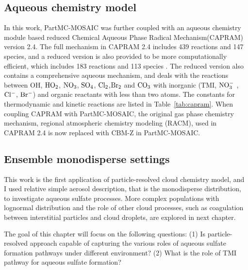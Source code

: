 \documentclass[edeposit,fullpage]{uiucthesis2009}
\begin{document}
\subsection{Aqueous chemistry model}
\label{section:aq-chem-model}
In this work, PartMC-MOSAIC was further coupled with an aqueous chemistry module based reduced Chemical Aqueous Phase Radical Mechanism(CAPRAM) version 2.4. The full mechanism in CAPRAM 2.4 includes 439 reactions and 147 species, and a reduced version is also provided to be more computationally efficient, which includes 183 reactions and 113 species \citep{Ervens2003}. The reduced version also contains a comprehensive aqueous mechanism, and deals with the reactions between OH, $\rm HO_2$, $\rm NO_3$, $\rm SO_4$, $\rm Cl_2$,$\rm Br_2$ and $\rm CO_3$ with inorganic (TMI, $\rm NO_3^-$ , $\rm Cl^-$, $\rm Br^-$) and organic reactants with less than two atoms. The constants for thermodynamic and kinetic reactions are listed in Table~\ref{tab:capram}. When coupling CAPRAM with PartMC-MOSAIC, the original gas phase chemistry mechanism, regional atmospheric chemistry modeling (RACM), used in CAPRAM 2.4 is now replaced with CBM-Z in PartMC-MOSAIC. 

\subsection{Ensemble monodisperse settings}
This work is the first application of particle-resolved cloud chemistry model, and I used relative simple aerosol description, that is the monodisperse distribution, to investigate aqueous sulfate processes. More complex populations with lognormal distribution and the role of other cloud processes, such as coagulation between interstitial particles and cloud droplets, are explored in next chapter. 

The goal of this chapter will focus on the following questions: (1) Is particle-resolved approach capable of capturing the various roles of aqueous sulfate formation pathways under different environment? (2) What is the role of TMI pathway for aqueous sulfate formation? 
\end{document}
